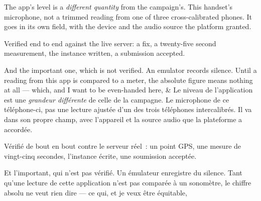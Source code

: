 \documentclass[10pt,a4paper]{article}
\begin{document}
\begin{say}
The app's level is a \emph{different quantity} from the campaign's. This handset's
microphone, not a trimmed reading from one of three cross-calibrated phones. It
goes in its own field, with the device and the audio source the platform granted.

Verified end to end against the live server: a fix, a twenty-five second
measurement, the instance written, a submission accepted.

And the important one, which is not verified.  An emulator records silence. Until a reading from
this app is compared to a meter, the absolute figure means nothing at all ---
which, and I want to be even-handed here, 
&
Le niveau de l'application est une \emph{grandeur différente} de celle de la
campagne. Le microphone de ce téléphone-ci, pas une lecture ajustée d'un des trois
téléphones intercalibrés. Il va dans son propre champ, avec l'appareil et la
source audio que la plateforme a accordée. 

Vérifié de bout en bout contre le serveur réel~: un point GPS, une mesure de
vingt-cinq secondes, l'instance écrite, une soumission acceptée.

Et l'important, qui n'est pas vérifié.  Un émulateur enregistre du silence. Tant qu'une lecture de
cette application n'est pas comparée à un sonomètre, le chiffre absolu ne veut
rien dire --- ce qui, et je veux être équitable, 
\end{say}
\end{document}
